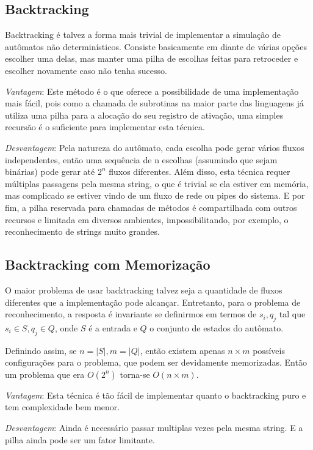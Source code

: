 \documentclass[a4paper,12pt,oneside,onecolumn]{uerj}
\begin{document}
\subsection{Backtracking}

Backtracking é talvez a forma mais trivial de implementar a simulação de autômatos não determinísticos. Consiste basicamente em diante de várias opções escolher uma delas, mas manter uma pilha de escolhas feitas para retroceder e escolher novamente caso não tenha sucesso.

\emph{Vantagem}: Este método é o que oferece a possibilidade de uma implementação mais fácil, pois como a chamada de subrotinas na maior parte das linguagens já utiliza uma pilha para a alocação do seu registro de ativação, uma simples recursão é o suficiente para implementar esta técnica.

\emph{Desvantagem}: Pela natureza do autômato, cada escolha pode gerar vários fluxos independentes, então uma sequência de n escolhas (assumindo que sejam binárias) pode gerar até $2^n$ fluxos diferentes. Além disso, esta técnica requer múltiplas passagens pela mesma string, o que é trivial se ela estiver em memória, mas complicado se estiver vindo de um fluxo de rede ou pipes do sistema. E por fim, a pilha reservada para chamadas de métodos é compartilhada com outros recursos e limitada em diversos ambientes, impossibilitando, por exemplo, o reconhecimento de strings muito grandes.

\subsection{Backtracking com Memorização}

O maior problema de usar backtracking talvez seja a quantidade de fluxos diferentes que a implementação pode alcançar. Entretanto, para o problema de reconhecimento, a resposta é invariante se definirmos em termos de $s_i, q_j$ tal que $s_i \in S, q_j \in Q$, onde $S$ é a entrada e $Q$ o conjunto de estados do autômato.

Definindo assim, se $n = |S|, m = |Q|$, então existem apenas $n \times m$ possíveis configurações para o problema, que podem ser devidamente memorizadas. Então um problema que era $O(2^n)$ torna-se $O(n\times m)$.

\emph{Vantagem}: Esta técnica é tão fácil de implementar quanto o backtracking puro e tem complexidade bem menor.

\emph{Desvantagem}: Ainda é necessário passar multiplas vezes pela mesma string. E a pilha ainda pode ser um fator limitante.
\end{document}
